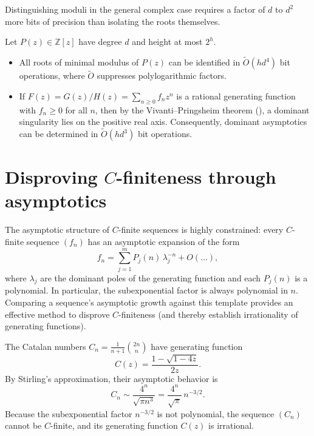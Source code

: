 Distinguishing moduli in the general complex case requires a factor of \(d\) to \(d^2\) more bits of precision than isolating the roots themselves.

\begin{corollary}
    \label{cor:dominant-singularity-complexity}
    Let \(P(z) \in \mathbb{Z}[z]\) have degree \(d\) and height at most \(2^h\).
    \begin{itemize}
        \item All roots of minimal modulus of \(P(z)\) can be identified in \(\widetilde{O}(h d^4)\) bit operations, where \(\widetilde{O}\) suppresses polylogarithmic factors.
        \item If \(F(z) = G(z)/H(z) = \sum_{n \ge 0} f_n z^n\) is a rational generating function with \(f_n \ge 0\) for all \(n\), then by the Vivanti--Pringsheim theorem (), a dominant singularity lies on the positive real axis.
        Consequently, dominant asymptotics can be determined in \(\widetilde{O}(h d^3)\) bit operations.
    \end{itemize}
\end{corollary}


\section*{Disproving \(C\)-finiteness through asymptotics}

The asymptotic structure of \(C\)-finite sequences is highly constrained: every \(C\)-finite sequence \((f_n)\) has an asymptotic expansion of the form
\[
    f_n = \sum_{j=1}^m P_j(n) \, \lambda_j^{-n} + O(\dots),
\]
where \(\lambda_j\) are the dominant poles of the generating function and each \(P_j(n)\) is a polynomial.
In particular, the subexponential factor is always polynomial in \(n\).
Comparing a sequence's asymptotic growth against this template provides an effective method to disprove \(C\)-finiteness (and thereby establish irrationality of generating functions).

\begin{example}
    The Catalan numbers \(C_n = \frac{1}{n+1} \binom{2n}{n}\) have generating function
    \[
        C(z) = \frac{1 - \sqrt{1 - 4z}}{2z}.
    \]
    By Stirling's approximation, their asymptotic behavior is
    \[
        C_n \sim \frac{4^n}{\sqrt{\pi n^3}} = \frac{4^n}{\sqrt{\pi}} \, n^{-3/2}.
    \]
    Because the subexponential factor \(n^{-3/2}\) is not polynomial, the sequence \((C_n)\) cannot be \(C\)-finite, and its generating function \(C(z)\) is irrational.
\end{example}

